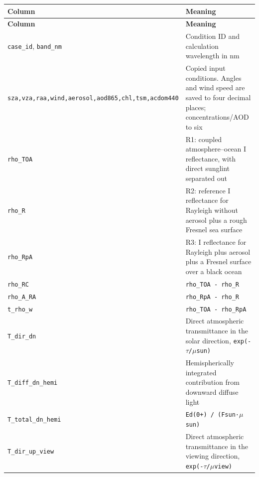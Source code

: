 {\TableFont
\begin{longtable}{@{}>{\raggedright\arraybackslash}p{}>{\raggedright\arraybackslash}p{}@{}}
\toprule
\textbf{Column} & \textbf{Meaning} \\
\midrule
\endfirsthead
\toprule
\textbf{Column} & \textbf{Meaning} \\
\midrule
\endhead
\bottomrule
\endfoot
\texttt{case\_\allowbreak{}id}, \texttt{band\_\allowbreak{}nm} & Condition ID and calculation wavelength in nm \\
\texttt{sza,\allowbreak{}vza,\allowbreak{}raa,\allowbreak{}wind,\allowbreak{}aerosol,\allowbreak{}aod865,\allowbreak{}chl,\allowbreak{}tsm,\allowbreak{}acdom440} & Copied input conditions. Angles and wind speed are saved to four decimal places; concentrations/AOD to six \\
\texttt{rho\_\allowbreak{}TOA} & R1: coupled atmosphere--ocean I reflectance, with direct sunglint separated out \\
\texttt{rho\_\allowbreak{}R} & R2: reference I reflectance for Rayleigh without aerosol plus a rough Fresnel sea surface \\
\texttt{rho\_\allowbreak{}RpA} & R3: I reflectance for Rayleigh plus aerosol plus a Fresnel surface over a black ocean \\
\texttt{rho\_\allowbreak{}RC} & \texttt{rho\_\allowbreak{}TOA - rho\_\allowbreak{}R} \\
\texttt{rho\_\allowbreak{}A\_\allowbreak{}RA} & \texttt{rho\_\allowbreak{}RpA - rho\_\allowbreak{}R} \\
\texttt{t\_\allowbreak{}rho\_\allowbreak{}w} & \texttt{rho\_\allowbreak{}TOA - rho\_\allowbreak{}RpA} \\
\texttt{T\_\allowbreak{}dir\_\allowbreak{}dn} & Direct atmospheric transmittance in the solar direction, \texttt{exp(-\ensuremath{\tau}/\allowbreak{}\ensuremath{\mu}sun)} \\
\texttt{T\_\allowbreak{}diff\_\allowbreak{}dn\_\allowbreak{}hemi} & Hemispherically integrated contribution from downward diffuse light \\
\texttt{T\_\allowbreak{}total\_\allowbreak{}dn\_\allowbreak{}hemi} & \texttt{Ed(0+) /\allowbreak{} (Fsun·\ensuremath{\mu}sun)} \\
\texttt{T\_\allowbreak{}dir\_\allowbreak{}up\_\allowbreak{}view} & Direct atmospheric transmittance in the viewing direction, \texttt{exp(-\ensuremath{\tau}/\allowbreak{}\ensuremath{\mu}view)} \\

\end{longtable}}
